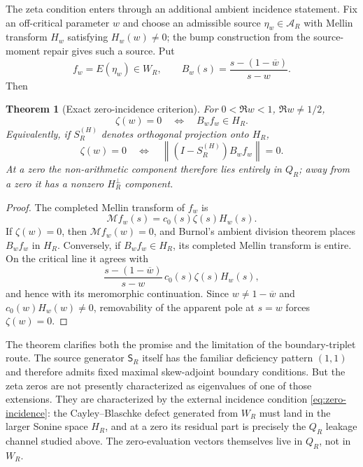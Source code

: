 \documentclass[11pt]{article}
\newtheorem{theorem}{Theorem}[section]
\theoremstyle{remark}
\newcommand{\norm}[1]{\left\lVert #1\right\rVert}
\begin{document}
The zeta condition enters through an additional ambient incidence statement.  Fix an off-critical parameter $w$ and choose an admissible source $\eta_w\in\mathcal A_R$ with Mellin transform $H_w$ satisfying $H_w(w)\ne0$; the bump construction from the source-moment repair gives such a source.  Put
\[
 f_w=E(\eta_w)\in W_R,
 \qquad
 B_w(s)=\frac{s-(1-\overline w)}{s-w}.
\]
Then
\begin{theorem}[Exact zero-incidence criterion]\label{thm:zero-incidence}
For $0<\Re w<1$, $\Re w\ne1/2$,
\begin{equation}\label{eq:zero-incidence}
 \boxed{\zeta(w)=0\quad\Longleftrightarrow\quad B_wf_w\in H_R.}
\end{equation}
Equivalently, if $S_R^{(H)}$ denotes orthogonal projection onto $H_R$,
\begin{equation}\label{eq:zero-incidence-distance}
 \boxed{\zeta(w)=0\quad\Longleftrightarrow\quad
 \norm{(I-S_R^{(H)})B_wf_w}=0.}
\end{equation}
At a zero the non-arithmetic component therefore lies entirely in $Q_R$; away from a zero it has a nonzero $H_R^\perp$ component.
\end{theorem}
\begin{proof}
The completed Mellin transform of $f_w$ is
\[
 \mathcal M f_w(s)=c_0(s)\zeta(s)H_w(s).
\]
If $\zeta(w)=0$, then $\mathcal M f_w(w)=0$, and Burnol's ambient division theorem places $B_wf_w$ in $H_R$.  Conversely, if $B_wf_w\in H_R$, its completed Mellin transform is entire.  On the critical line it agrees with
\[
 \frac{s-(1-\overline w)}{s-w}\,c_0(s)\zeta(s)H_w(s),
\]
and hence with its meromorphic continuation.  Since $w\ne1-\overline w$ and $c_0(w)H_w(w)\ne0$, removability of the apparent pole at $s=w$ forces $\zeta(w)=0$.
\end{proof}

The theorem clarifies both the promise and the limitation of the boundary-triplet route.  The source generator $\mathsf S_R$ itself has the familiar deficiency pattern $(1,1)$ and therefore admits fixed maximal skew-adjoint boundary conditions.  But the zeta zeros are not presently characterized as eigenvalues of one of those extensions.  They are characterized by the external incidence condition \eqref{eq:zero-incidence}: the Cayley--Blaschke defect generated from $W_R$ must land in the larger Sonine space $H_R$, and at a zero its residual part is precisely the $Q_R$ leakage channel studied above.  The zero-evaluation vectors themselves live in $Q_R$, not in $W_R$.
\end{document}
